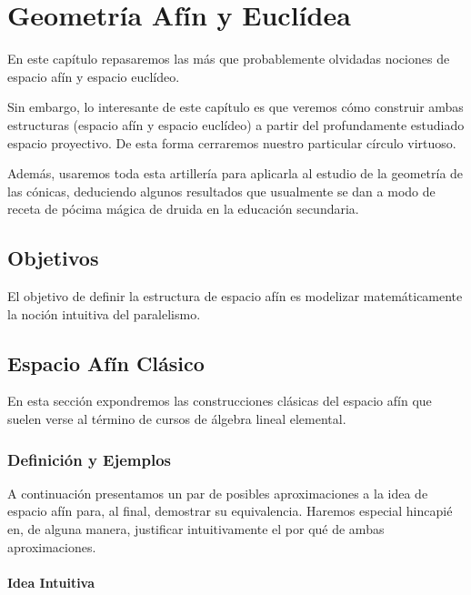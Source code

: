 \chapter{Geometría Afín y Euclídea}
\label{afin}
En este capítulo repasaremos las más que probablemente olvidadas nociones de espacio afín y espacio euclídeo.

Sin embargo, lo interesante de este capítulo es que veremos cómo construir ambas estructuras (espacio afín y espacio euclídeo) a partir del profundamente estudiado espacio proyectivo. De esta forma cerraremos nuestro particular círculo virtuoso.

Además, usaremos toda esta artillería para aplicarla al estudio de la geometría de las cónicas, deduciendo algunos resultados que usualmente se dan a modo de receta de pócima mágica de druida en la educación secundaria.
\section{Objetivos}
\label{afinObj}
El objetivo de definir la estructura de espacio afín es modelizar matemáticamente la noción intuitiva del paralelismo.
\section{Espacio Afín Clásico}
\label{afinClas}
En esta sección expondremos las construcciones clásicas del espacio afín que suelen verse al término de cursos de álgebra lineal elemental.
\subsection{Definición y Ejemplos}
\label{afinClasDef}
A continuación presentamos un par de posibles aproximaciones a la idea de espacio afín para, al final, demostrar su equivalencia. Haremos especial hincapié en, de alguna manera, justificar intuitivamente el por qué de ambas aproximaciones.
\subsubsection{Idea Intuitiva}
\label{afinClasDefIdea}

